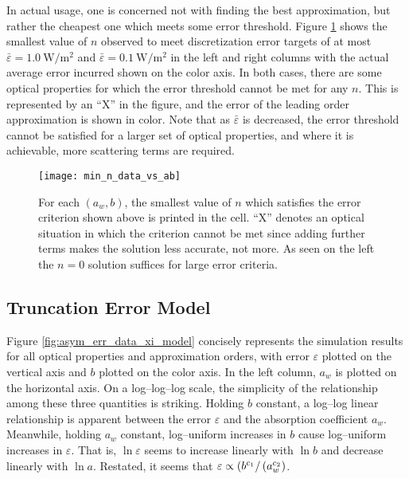 In actual usage, one is concerned not with finding the best approximation, but rather the cheapest one which meets some error threshold.
Figure \ref{fig:min_n_data_vs_ab} shows the smallest value of $n$ observed to meet discretization error targets of at most $\bar{\varepsilon}=\SI{1.0}{\W\per\m\squared}$ and $\bar{\varepsilon}=\SI{0.1}{\W\per\m\squared}$ in the left and right columns with the actual average error incurred shown on the color axis.
In both cases, there are some optical properties for which the error threshold cannot be met for any $n$.
This is represented by an ``X'' in the figure, and the error of the leading order approximation is shown in color.
Note that as $\bar\varepsilon$ is decreased, the error threshold cannot be satisfied for a larger set of optical properties, and where it is achievable, more scattering terms are required.

\begin{figure}[H]
  \centering
  \texttt{[image: min\_n\_data\_vs\_ab]}
  \caption{For each $(a_w,b)$, the smallest value of $n$ which satisfies the error criterion shown above is printed in the cell. ``X'' denotes an optical situation in which the criterion cannot be met since adding further terms makes the solution less accurate, not more. As seen on the left the $n=0$ solution suffices for large error criteria.}
  \label{fig:min_n_data_vs_ab}
\end{figure}

\subsection{Truncation Error Model}
Figure \ref{fig:asym_err_data_xi_model} concisely represents the simulation results for all optical properties and approximation orders, with error $\varepsilon$ plotted on the vertical axis and $b$ plotted on the color axis.
In the left column, $a_w$ is plotted on the horizontal axis.
On a log--log--log scale, the simplicity of the relationship among these three quantities is striking.
Holding $b$ constant, a log--log linear relationship is apparent between the error $\varepsilon$ and the absorption coefficient $a_w$.
Meanwhile, holding $a_w$ constant, log--uniform increases in $b$ cause log--uniform increases in $\varepsilon$.
That is, $\ln\varepsilon$ seems to increase linearly with $\ln b$ and decrease linearly with $\ln a$.
Restated, it seems that $\varepsilon \propto \left({b^{c_1}}\right/\left({a_w^{c_2}}\right)$.

